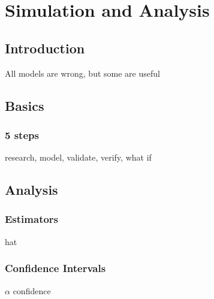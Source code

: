 
\chapter{Simulation and Analysis}




\section{Introduction}
All models are wrong, but some are useful

\section{Basics}
\subsection{5 steps}
research, model, validate, verify, what if

\section{Analysis}
\subsection{Estimators}
hat
\subsection{Confidence Intervals}
$\alpha$ confidence